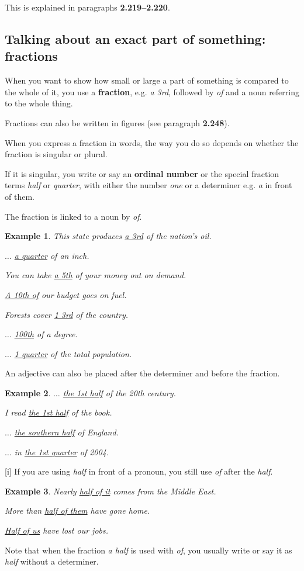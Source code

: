 \documentclass[oneside]{book}
\numberwithin{equation}{section}
\newtheorem{example}{Example}[section]
\begin{document}
This is explained in paragraphs \textbf{2.219--2.220}.

\subsection{Talking about an exact part of something: fractions}
\noindent{} When you want to show how small or large a part of something is compared to the whole of it, you use a \textbf{fraction}, e.g. \textit{a 3rd}, followed by \textit{of} and a noun referring to the whole thing.

Fractions can also be written in figures (see paragraph \textbf{2.248}).

%
\noindent{} When you express a fraction in words, the way you do so depends on whether the fraction is singular or plural.

If it is singular, you write or say an \textbf{ordinal number} or the special fraction terms \textit{half} or \textit{quarter}, with either the number \textit{one} or a determiner e.g. \textit{a} in front of them.

The fraction is linked to a noun by \textit{of}.
\begin{example}
    This state produces \underline{a 3rd} of the nation's oil.
    
    $\ldots$ \underline{a quarter} of an inch.
    
    You can take \underline{a 5th} of your money out on demand.
    
    \underline{A 10th of} our budget goes on fuel.
    
    Forests cover \underline{1 3rd} of the country.
    
    $\ldots$ \underline{100th} of a degree.
    
    $\ldots$ \underline{1 quarter} of the total population.
\end{example}
An adjective can also be placed after the determiner and before the fraction.
\begin{example}
    $\ldots$ \underline{the 1st half} of the 20th century.
    
    I read \underline{the 1st half} of the book.
    
    $\ldots$ \underline{the southern half} of England.
    
    $\ldots$ in \underline{the 1st quarter} of 2004.
\end{example}
%
\noindent{} [i] If you are using \textit{half} in front of a pronoun, you still use \textit{of} after the \textit{half}.
\begin{example}
    Nearly \underline{half of it} comes from the Middle East.
    
    More than \underline{half of them} have gone home.
    
    \underline{Half of us} have lost our jobs.
\end{example}
Note that when the fraction \textit{a half} is used with \textit{of}, you usually write or say it as \textit{half} without a determiner.
\end{document}
